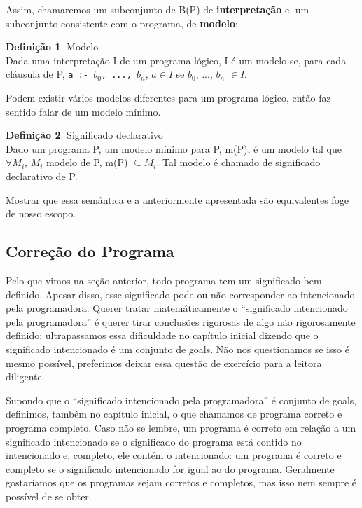 \documentclass{article}
\theoremstyle{definition}
\newtheorem{definition}{Definição}[section]
\theoremstyle{remark}
\begin{document}
  Assim, chamaremos um subconjunto de B(P) de \textbf{interpretação} e, um subconjunto consistente com o programa, de \textbf{modelo}:

\begin{definition}{Modelo}
  \\ Dada uma interpretação I de um programa lógico, I é um modelo se, para cada cláusula de P, {\tt a :- $b_0$, ..., $b_n$}, $a \in I$ se $b_0$, ..., $b_n$ $\in I$.
\end{definition}

 Podem existir vários modelos diferentes para um programa lógico, então faz sentido falar de um modelo mínimo.

\begin{definition}{Significado declarativo}
  \\ Dado um programa P, um modelo mínimo para P, m(P), é um modelo tal que $\forall M_i$, $M_i$ modelo de P, m(P) $\subseteq M_i$. Tal modelo é chamado de significado declarativo de P.
\end{definition}

Mostrar que essa semântica e a anteriormente apresentada são equivalentes foge de nosso escopo.

\subsection{Correção do Programa}

Pelo que vimos na seção anterior, todo programa tem um significado bem definido. Apesar disso, esse significado pode ou não corresponder ao intencionado pela programadora. Querer tratar matemáticamente o ``significado intencionado pela programadora'' é querer tirar conclusões rigorosas de algo não rigorosamente definido: ultrapassamos essa dificuldade no capítulo inicial dizendo que o significado intencionado é um conjunto de goals. Não nos questionamos se
isso é mesmo possível, preferimos deixar essa questão de exercício para a leitora diligente.

Supondo que o ``significado intencionado pela programadora'' é conjunto de goals, definimos, também no capítulo inicial, o que chamamos de programa correto e programa completo. Caso não se lembre, um programa é correto em relação a um significado intencionado se o significado do programa está contido no intencionado e, completo, ele contém o intencionado: um programa é correto e completo se o significado intencionado for igual ao do programa.
Geralmente gostaríamos que os programas sejam corretos e completos, mas isso nem sempre é possível de se obter.
\end{document}
